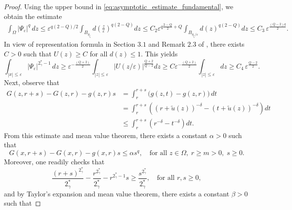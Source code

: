 \documentclass[11pt]{article}
\begin{document}
\begin{proof}
Using the upper bound in \eqref{eq:asymptotic_estimate_fundamental}, we obtain the estimate
\begin{equation}\label{eq:psi-delta-bound}
\begin{aligned}
\int_{\Omega} |\Psi_\varepsilon|^q \, dz \leq \varepsilon^{q(2-Q)/2} \int_{B_{\eta_{\zeta}}}d\left( \frac{z}{\varepsilon} \right)^{q(2-Q)} dz
\leq C_2 \varepsilon^{q\frac{2-Q}{2} + Q}\int_{B_{\eta_{\zeta}/\varepsilon}} d(z)^{q(2-Q)} dz
\le C_3 \, \varepsilon^{\frac{(Q-2)q}{2}}. 
\end{aligned}
\end{equation}
In view of representation formula in Section $3.1$ and Remark $2.3$ of \cite{ambrosio_representation_formula}, there exists $C>0$ such that $U(z) \geq C$ for all $d(z) \leq 1$. This yields
\begin{equation}\label{eq:psi_subcritical_lower}
\int_{|x| \le \varepsilon} |\Psi_\varepsilon|^{2_{\gamma}^* - 1} \, dz 
\geq \varepsilon^{-\frac{(Q+2)}{2}} \int_{|z|\leq \varepsilon} |U(z/\varepsilon)|^{\frac{Q+2}{Q-2}} dz \geq C \varepsilon^{-\frac{(Q+2)}{2}} \int_{|z|\leq \varepsilon} dz
\ge C_4 \, \varepsilon^{\frac{Q-2}{2}}.
\end{equation}
Next, observe that
\begin{equation*}
\begin{aligned}
G(z, r+s) - G(z, r) - g(z, r)s
&= \int_r^{r+s} \big( g(z,t) - g(z, r) \big) \, dt \\
&= \int_r^{r+s} \left( (r + \tilde u(z))^{-\delta} - (t + \tilde u(z))^{-\delta} \right) dt \\
&\le \int_r^{r+s} \left( r^{-\delta} - t^{-\delta} \right) dt .
\end{aligned}
\end{equation*}
From this estimate and mean value theorem, there exists a constant $\alpha > 0$ such that
\begin{equation}\label{eq:G-alpha-estimate}
G(x, r+s) - G(x, r) - g(x, r)s \le \alpha s^q,
\quad \text{for all } z \in \Omega,\; r \ge m >0,\; s \ge 0 .
\end{equation}
Moreover, one readily checks that
\begin{equation}\label{eq:power-inequality-basic}
\frac{(r+s)^{2_{\gamma}^*}}{ 2_{\gamma}^*} - \frac{r^{2_{\gamma}^*}}{2_{\gamma}^*} - r^{2_{\gamma}^* - 1} s \ge \frac{s^{2_{\gamma}^*}}{2_{\gamma}^*},
\quad \text{for all } r, s \ge 0,
\end{equation}
and by Taylor's expansion and mean value theorem, there exists a constant $\beta > 0$ such that

\end{proof}
\end{document}
